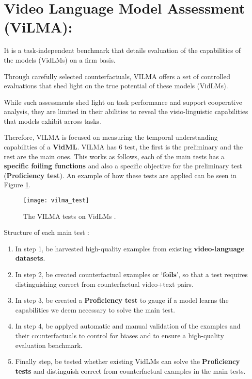 \section{Video Language Model Assessment (ViLMA):}

It is a task-independent benchmark that details evaluation of the capabilities of the models (VidLMs) on a firm basis.

Through carefully selected counterfactuals, VILMA offers a set of controlled evaluations that shed light on the true potential of these models (VidLMs).

While such assessments shed light on task performance and support cooperative analysis, they are limited in their abilities to reveal the visio-linguistic capabilities that models exhibit across tasks.

Therefore, VILMA is focused on measuring the temporal understanding capabilities of a \textbf{VidML}. VILMA has 6 test, the first is the preliminary and the rest are the main ones. This works as follows, each of the main tests has a \textbf{specific foiling functions} and also a specific objective for the preliminary test (\textbf{Proficiency test}). An example of how these tests are applied can be seen in Figure \ref{fig:vilma_test}.

\begin{figure}[ht]
    \centering
    \texttt{[image: vilma\_test]}
    \caption{The VILMA tests on VidLMs \cite[Table 1]{kesen2023ViLMA}.}
    \label{fig:vilma_test}
\end{figure}

Structure of each main test \cite{kesen2023ViLMA}:
{\it 
\begin{structure}

\begin{enumerate} \label{test_structure}
\item In step 1, be harvested high-quality examples from existing \textbf{video-language datasets}.
\item In step 2, be created counterfactual examples or ‘\textbf{foils}’, so that a test requires distinguishing correct from counterfactual video+text pairs.
\item In step 3, be created a \textbf{Proficiency test} to gauge if a model learns the capabilities we deem necessary to solve the main test.
\item In step 4, be applyed automatic and manual validation of the examples and their counterfactuals to control for biases and to ensure a high-quality evaluation benchmark.
\item Finally step, be tested whether existing VidLMs can solve the \textbf{Proficiency tests} and distinguish correct from counterfactual examples in the main tests.
\end{enumerate}
\end{structure}

}

